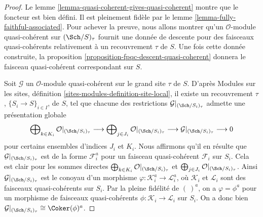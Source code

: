 \begin{proof}
Le lemme \ref{lemma-quasi-coherent-gives-quasi-coherent} montre que le
foncteur est bien défini. Il est pleinement fidèle par le lemme
\ref{lemma-fully-faithful-associated}. Pour achever la preuve, nous allons
montrer qu'un $\mathcal{O}$-module quasi-cohérent sur $(\Sch/S)_\tau$
fournit une donnée de descente pour des faisceaux quasi-cohérents
relativement à un recouvrement $\tau$ de $S$. Une fois cette donnée
construite, la proposition \ref{proposition-fpqc-descent-quasi-coherent}
donnera le faisceau quasi-cohérent correspondant sur $S$.

\medskip\noindent
Soit $\mathcal{G}$ un $\mathcal{O}$-module quasi-cohérent sur le grand
site $\tau$ de $S$. D'après Modules sur les sites, définition
\ref{sites-modules-definition-site-local}, il existe un recouvrement
$\tau$, $\{S_i \to S\}_{i \in I}$, de $S$, tel que chacune des restrictions
$\mathcal{G}|_{(\Sch/S_i)_\tau}$ admette une présentation globale
$$
\bigoplus\nolimits_{k \in K_i} \mathcal{O}|_{(\Sch/S_i)_\tau}
\longrightarrow
\bigoplus\nolimits_{j \in J_i} \mathcal{O}|_{(\Sch/S_i)_\tau}
\longrightarrow
\mathcal{G}|_{(\Sch/S_i)_\tau} \longrightarrow 0
$$
pour certains ensembles d'indices $J_i$ et $K_i$. Nous affirmons qu'il
en résulte que $\mathcal{G}|_{(\Sch/S_i)_\tau}$ est de la forme
$\mathcal{F}_i^a$ pour un faisceau quasi-cohérent $\mathcal{F}_i$ sur
$S_i$. Cela est clair
pour les sommes directes
$\bigoplus\nolimits_{k \in K_i} \mathcal{O}|_{(\Sch/S_i)_\tau}$ et
$\bigoplus\nolimits_{j \in J_i} \mathcal{O}|_{(\Sch/S_i)_\tau}$.
Ainsi $\mathcal{G}|_{(\Sch/S_i)_\tau}$ est le conoyau d'un morphisme
$\varphi : \mathcal{K}_i^a \to \mathcal{L}_i^a$, où
$\mathcal{K}_i$ et $\mathcal{L}_i$ sont des faisceaux quasi-cohérents
sur $S_i$. Par la pleine fidélité de $(\ )^a$, on a
$\varphi = \phi^a$ pour un morphisme de faisceaux quasi-cohérents
$\phi : \mathcal{K}_i \to \mathcal{L}_i$ sur $S_i$. On a donc bien
$\mathcal{G}|_{(\Sch/S_i)_\tau} \cong \Coker(\phi)^a$.


\end{proof}
